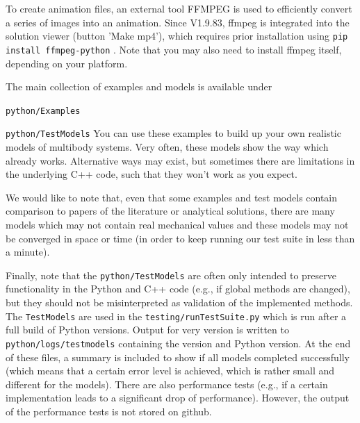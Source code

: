 To create animation files, an external tool FFMPEG is used to efficiently convert a series of images into an animation. Since \codeName V1.9.83, ffmpeg is integrated into the solution viewer (button 'Make mp4'), which requires prior installation using \texttt{pip install ffmpeg-python} . 
Note that you may also need to install ffmpeg itself, depending on your platform.


The main collection of examples and models is available under
\bi
  \item \texttt{python/Examples}
  \item \texttt{python/TestModels}
\ei
You can use these examples to build up your own realistic models of multibody systems.
Very often, these models show the way which already works. Alternative ways may exist, but
sometimes there are limitations in the underlying C++ code, such that they won't work as you expect.

We would like to note that, even that some examples and test models contain comparison to 
papers of the literature or analytical solutions, there are many models which may not contain real
mechanical values and these models may not be converged in space or time 
(in order to keep running our test suite in less than a minute).

Finally, note that the \texttt{python/TestModels} are often only intended to preserve functionality
in the Python and C++ code (e.g., if global methods are changed), but they should not be misinterpreted as validation of the 
implemented methods. The \texttt{TestModels} are used in the \codeName {} \texttt{testing/runTestSuite.py}
which is run after a full build of Python versions. Output for very version is written
to \texttt{python/logs/testmodels} containing the \codeName version and Python version. At the end of these
files, a summary is included to show if all models completed successfully (which means that a certain error level is achieved, which is rather small and different for the models).
There are also performance tests (e.g., if a certain implementation leads to a significant drop of performance).
However, the output of the performance tests is not stored on github.

